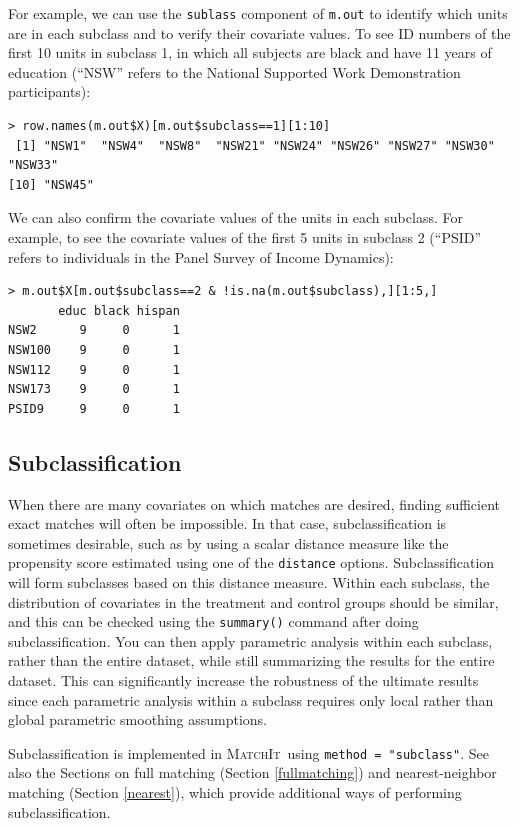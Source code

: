 \documentclass[oneside,letterpaper,titlepage]{article}
\newcommand{\MatchIt}{\textsc{MatchIt}}
\begin{document}
For example, we can use the {\tt sublass} component of {\tt m.out} to
identify which units are in each subclass and to verify their
covariate values.  To see ID numbers of the first 10 units in subclass
1, in which all subjects are black and have 11 years of education
(``NSW'' refers to the National Supported Work Demonstration
participants):
\begin{verbatim}
> row.names(m.out$X)[m.out$subclass==1][1:10]
 [1] "NSW1"  "NSW4"  "NSW8"  "NSW21" "NSW24" "NSW26" "NSW27" "NSW30" "NSW33"
[10] "NSW45"
\end{verbatim}
We can also confirm the covariate values of the units in each
subclass.  For example, to see the covariate values of the first 5
units in subclass 2 (``PSID'' refers to individuals in the Panel
Survey of Income Dynamics):
\begin{verbatim}
> m.out$X[m.out$subclass==2 & !is.na(m.out$subclass),][1:5,]
       educ black hispan
NSW2      9     0      1
NSW100    9     0      1
NSW112    9     0      1
NSW173    9     0      1
PSID9     9     0      1
\end{verbatim}

\subsection{Subclassification}
\label{subclass}

When there are many covariates on which matches are desired, finding
sufficient exact matches will often be impossible.  In that case,
subclassification is sometimes desirable, such as by using a scalar
distance measure like the propensity score estimated using one of the
\texttt{distance} options.  Subclassification will form subclasses
based on this distance measure.  Within each subclass, the
distribution of covariates in the treatment and control groups should
be similar, and this can be checked using the \texttt{summary()}
command after doing subclassification.  You can then apply parametric
analysis within each subclass, rather than the entire dataset, while
still summarizing the results for the entire dataset.  This can
significantly increase the robustness of the ultimate results since
each parametric analysis within a subclass requires only local rather
than global parametric smoothing assumptions.

Subclassification is implemented in \MatchIt\ using \texttt{method =
  "subclass"}.  See also the Sections on full matching (Section
\ref{fullmatching}) and nearest-neighbor matching (Section
\ref{nearest}), which provide additional ways of performing
subclassification.
\end{document}
